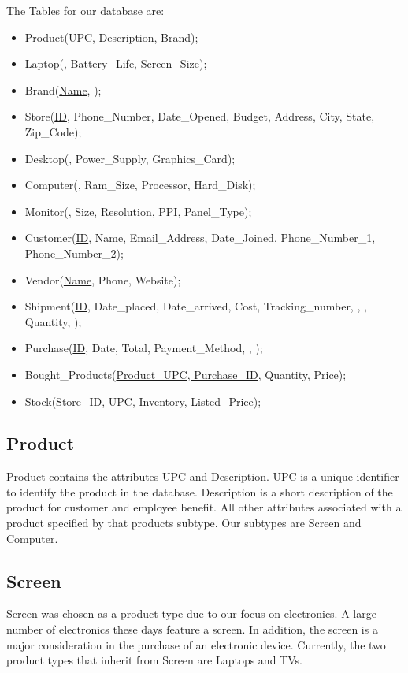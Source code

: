 \documentclass[12pt]{article}
\begin{document}
		\noindent 
		The Tables for our database are:
		\begin{itemize}
			\item Product(\underline{UPC}, Description, Brand);
			\item Laptop(, Battery\_Life, Screen\_Size);
      \item Brand(\underline{Name}, );
      \item Store(\underline{ID}, Phone\_Number, Date\_Opened, Budget, Address, City, State, Zip\_Code);
			\item Desktop(, Power\_Supply, Graphics\_Card);
			\item Computer(, Ram\_Size, Processor, Hard\_Disk);
      \item Monitor(, Size, Resolution, PPI, Panel\_Type);
			\item Customer(\underline{ID}, Name, Email\_Address, Date\_Joined, Phone\_Number\_1, Phone\_Number\_2);
			\item Vendor(\underline{Name}, Phone, Website);
      \item Shipment(\underline{ID}, Date\_placed, Date\_arrived, Cost, Tracking\_number,
        , , Quantity, );
      \item Purchase(\underline{ID}, Date, Total, Payment\_Method, , );
      \item Bought\_Products(\underline{Product\_UPC, Purchase\_ID}, Quantity, Price);
      \item Stock(\underline{Store\_ID, UPC}, Inventory, Listed\_Price);
		\end{itemize}

		\subsection{Product}
			Product contains the attributes UPC and Description. UPC is a unique
			identifier to identify the product in the database. Description is a short
			description of the product for customer and employee benefit. All other
			attributes associated with a product specified by that products subtype.
			Our subtypes are Screen and Computer.

		\subsection{Screen}
			Screen was chosen as a product type due to our focus on electronics.  A
			large number of electronics these days feature a screen. In addition, the
			screen is a major consideration in the purchase of an electronic device.
			Currently, the two product types that inherit from Screen are Laptops and
			TVs.
\end{document}
